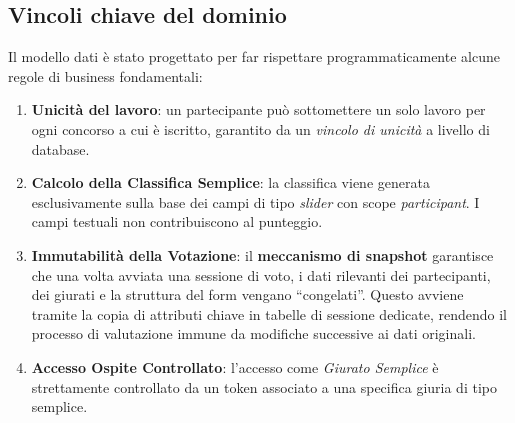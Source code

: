 \subsection{Vincoli chiave del dominio}\label{subsec:vincoli-chiave-del-dominio}
Il modello dati è stato progettato per far rispettare programmaticamente alcune regole di business fondamentali:
\begin{enumerate}
    \item \textbf{Unicità del lavoro}: un partecipante può sottomettere un solo lavoro per ogni concorso a cui è iscritto, garantito da un \emph{vincolo di unicità} a livello di database.
    \item \textbf{Calcolo della Classifica Semplice}: la classifica viene generata esclusivamente sulla base dei campi di tipo \emph{slider} con scope \emph{participant}.
    I campi testuali non contribuiscono al punteggio.
    \item \textbf{Immutabilità della Votazione}: il \textbf{meccanismo di snapshot} garantisce che una volta avviata una sessione di voto, i dati rilevanti dei partecipanti, dei giurati e la struttura del form vengano ``congelati''.
    Questo avviene tramite la copia di attributi chiave in tabelle di sessione dedicate, rendendo il processo di valutazione immune da modifiche successive ai dati originali.
    \item \textbf{Accesso Ospite Controllato}: l'accesso come \emph{Giurato Semplice} è strettamente controllato da un token associato a una specifica giuria di tipo semplice.
\end{enumerate}